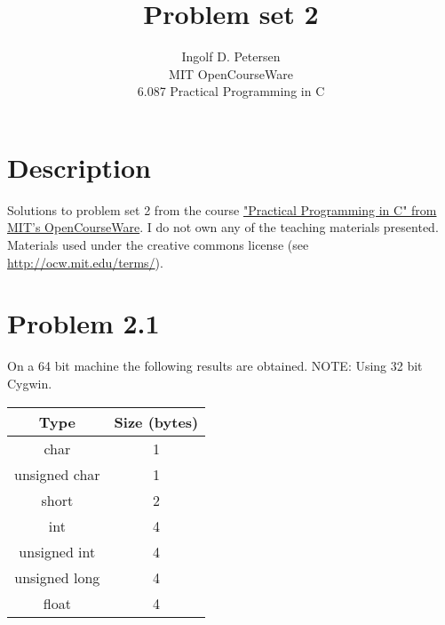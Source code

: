 \documentclass[12pt]{article}
\begin{document}
 
 
\title{Problem set 2}%
\author{Ingolf D. Petersen\\ %
MIT OpenCourseWare \\
6.087 Practical Programming in C} %
 
\maketitle
\section*{Description}
Solutions to problem set 2 from the course 
\href{http://ocw.mit.edu/courses/electrical-engineering-and-computer-science/6-087-practical-programming-in-c-january-iap-2010/index.htm}{"Practical Programming in C" from MIT's OpenCourseWare}. I do not own any of the teaching materials presented. Materials used under the creative commons license (see \href{http://ocw.mit.edu/terms/}{http://ocw.mit.edu/terms/}).


\section*{Problem 2.1}
On a 64 bit machine the following results are obtained. NOTE: Using 32 bit Cygwin.

\begin{table}[h!tb]
	\centering
    \begin{tabular}{|c|c|}
    \hline
    \textbf{Type}          & \textbf{Size (bytes)} \\ \hline
    char          & 1            \\
    unsigned char & 1            \\
    short         & 2            \\
    int           & 4            \\
    unsigned int  & 4            \\
    unsigned long & 4            \\
    float         & 4            \\
    \hline
    \end{tabular}
\end{table}
\end{document}

